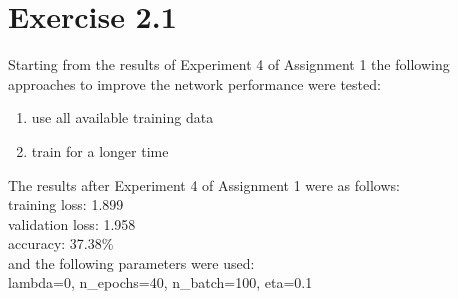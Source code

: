 \section{Exercise 2.1}
Starting from the results of Experiment 4 of Assignment 1 the following approaches to improve the network performance were tested:\\
\begin{enumerate}[label=(\roman*)]
    \item use all available training data
    \item train for a longer time
\end{enumerate}
The results after Experiment 4 of Assignment 1 were as follows:\\
training loss: 1.899\\
validation loss: 1.958\\
accuracy: 37.38\%\\
and the following parameters were used:\\
lambda=0, n\_epochs=40, n\_batch=100, eta=0.1



